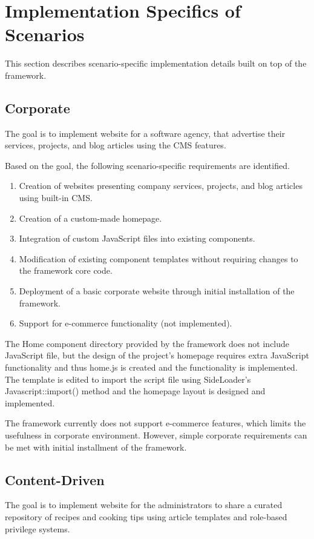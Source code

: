 \section{Implementation Specifics of Scenarios}\label{sec:implementation-specifics-of-scenarios}
This section describes scenario-specific implementation details built on top of the framework.

\subsection{Corporate}\label{subsec:corporate}
The goal is to implement website for a software agency, that advertise their services, projects, and blog articles
using the CMS features.

Based on the goal, the following scenario-specific requirements are identified.

\begin{enumerate}
    \item Creation of websites presenting company services, projects, and blog articles using built-in CMS\@.
    \item Creation of a custom-made homepage.
    \item Integration of custom JavaScript files into existing components.
    \item Modification of existing component templates without requiring changes to the framework core code.
    \item Deployment of a basic corporate website through initial installation of the framework.
    \item Support for e-commerce functionality (not implemented).
\end{enumerate}

The Home component directory provided by the framework does not include JavaScript file,
but the design of the project's homepage requires extra JavaScript functionality and thus home.js is created
and the functionality is implemented.
The template is edited to import the script file using SideLoader's Javascript::import() method and the homepage layout
is designed and implemented.

The framework currently does not support e-commerce features, which limits the usefulness in corporate environment.
However, simple corporate requirements can be met with initial installment of the framework.

\subsection{Content-Driven}\label{subsec:contentDriven}
The goal is to implement website for the administrators to share a curated repository of recipes and cooking tips
using article templates and role-based privilege systems.

